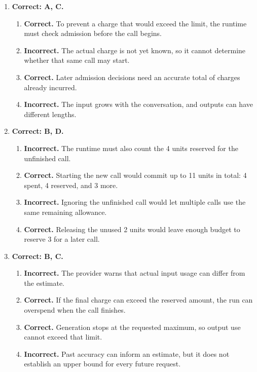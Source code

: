 \begin{enumerate}[start=51,itemsep=0.7\baselineskip]
\item[{\hyperref[exercise:51]{51.}}] \begin{minipage}[t]{\linewidth}
\textbf{Correct: A, C.}
\begin{enumerate}[label=\textnormal{(\Alph*)},leftmargin=*,itemsep=0pt]
\item \textbf{Correct.} To prevent a charge that would exceed the limit, the runtime must check admission before the call begins.
\item \textbf{Incorrect.} The actual charge is not yet known, so it cannot determine whether that same call may start.
\item \textbf{Correct.} Later admission decisions need an accurate total of charges already incurred.
\item \textbf{Incorrect.} The input grows with the conversation, and outputs can have different lengths.
\end{enumerate}
\end{minipage}

\item[{\hyperref[exercise:52]{52.}}] \begin{minipage}[t]{\linewidth}
\textbf{Correct: B, D.}
\begin{enumerate}[label=\textnormal{(\Alph*)},leftmargin=*,itemsep=0pt]
\item \textbf{Incorrect.} The runtime must also count the 4 units reserved for the unfinished call.
\item \textbf{Correct.} Starting the new call would commit up to 11 units in total: 4 spent, 4 reserved, and 3 more.
\item \textbf{Incorrect.} Ignoring the unfinished call would let multiple calls use the same remaining allowance.
\item \textbf{Correct.} Releasing the unused 2 units would leave enough budget to reserve 3 for a later call.
\end{enumerate}
\end{minipage}

\item[{\hyperref[exercise:53]{53.}}] \begin{minipage}[t]{\linewidth}
\textbf{Correct: B, C.}
\begin{enumerate}[label=\textnormal{(\Alph*)},leftmargin=*,itemsep=0pt]
\item \textbf{Incorrect.} The provider warns that actual input usage can differ from the estimate.
\item \textbf{Correct.} If the final charge can exceed the reserved amount, the run can overspend when the call finishes.
\item \textbf{Correct.} Generation stops at the requested maximum, so output use cannot exceed that limit.
\item \textbf{Incorrect.} Past accuracy can inform an estimate, but it does not establish an upper bound for every future request.
\end{enumerate}
\end{minipage}


\end{enumerate}
